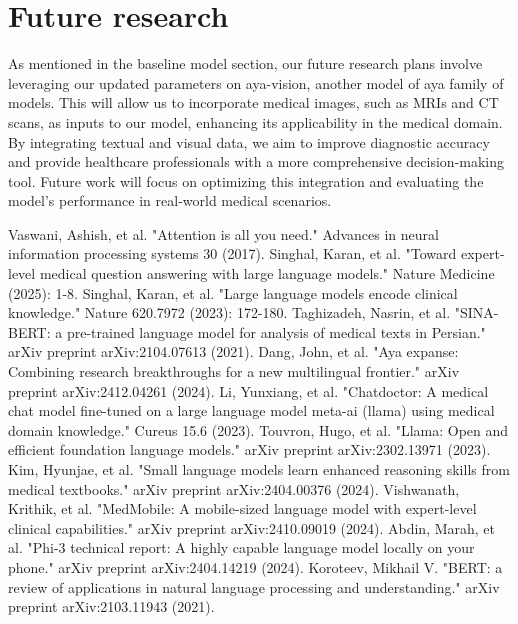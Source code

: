 \documentclass[conference]{IEEEtran}
\begin{document}
	\section*{Future research}
	As mentioned in the baseline model section, our future research plans involve leveraging our updated parameters on aya-vision, another model of aya family of models. This will allow us to incorporate medical images, such as MRIs and CT scans, as inputs to our model, enhancing its applicability in the medical domain. By integrating textual and visual data, we aim to improve diagnostic accuracy and provide healthcare professionals with a more comprehensive decision-making tool. Future work will focus on optimizing this integration and evaluating the model’s performance in real-world medical scenarios.
	
	
	\begin{thebibliography}{00}
		Vaswani, Ashish, et al. "Attention is all you need." Advances in neural information processing systems 30 (2017).
		Singhal, Karan, et al. "Toward expert-level medical question answering with large language models." Nature Medicine (2025): 1-8.
		Singhal, Karan, et al. "Large language models encode clinical knowledge." Nature 620.7972 (2023): 172-180.
		Taghizadeh, Nasrin, et al. "SINA-BERT: a pre-trained language model for analysis of medical texts in Persian." arXiv preprint arXiv:2104.07613 (2021).
		Dang, John, et al. "Aya expanse: Combining research breakthroughs for a new multilingual frontier." arXiv preprint arXiv:2412.04261 (2024).
		Li, Yunxiang, et al. "Chatdoctor: A medical chat model fine-tuned on a large language model meta-ai (llama) using medical domain knowledge." Cureus 15.6 (2023).
		Touvron, Hugo, et al. "Llama: Open and efficient foundation language models." arXiv preprint arXiv:2302.13971 (2023).
		Kim, Hyunjae, et al. "Small language models learn enhanced reasoning skills from medical textbooks." arXiv preprint arXiv:2404.00376 (2024).
		Vishwanath, Krithik, et al. "MedMobile: A mobile-sized language model with expert-level clinical capabilities." arXiv preprint arXiv:2410.09019 (2024).
		Abdin, Marah, et al. "Phi-3 technical report: A highly capable language model locally on your phone." 
		arXiv preprint arXiv:2404.14219 (2024).
		Koroteev, Mikhail V. "BERT: a review of applications in natural language processing and understanding." arXiv preprint arXiv:2103.11943 (2021).

\end{thebibliography}
\end{document}
